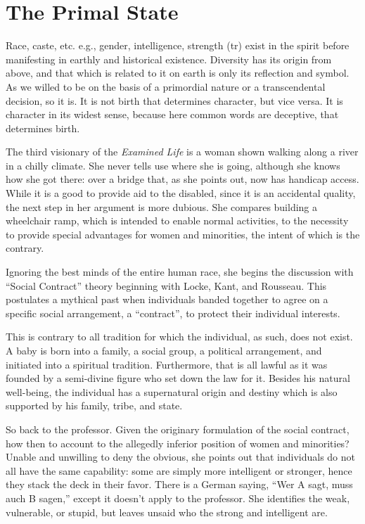 \section{The Primal State}

\begin{quotex}
Race, caste, etc. e.g., gender, intelligence, strength (tr) exist in the spirit before manifesting in earthly and historical existence. Diversity has its origin from above, and that which is related to it on earth is only its reflection and symbol. As we willed to be on the basis of a primordial nature or a transcendental decision, so it is. It is not birth that determines character, but vice versa. It is character in its widest sense, because here common words are deceptive, that determines birth.
\end{quotex}


The third visionary of the \emph{Examined Life} is a woman shown walking along a river in a chilly climate. She never tells use where she is going, although she knows how she got there: over a bridge that, as she points out, now has handicap access. While it is a good to provide aid to the disabled, since it is an accidental quality, the next step in her argument is more dubious. She compares building a wheelchair ramp, which is intended to enable normal activities, to the necessity to provide special advantages for women and minorities, the intent of which is the contrary.

Ignoring the best minds of the entire human race, she begins the discussion with ``Social Contract'' theory beginning with Locke, Kant, and Rousseau. This postulates a mythical past when individuals banded together to agree on a specific social arrangement, a ``contract'', to protect their individual interests.

This is contrary to all tradition for which the individual, as such, does not exist. A baby is born into a family, a social group, a political arrangement, and initiated into a spiritual tradition. Furthermore, that is all lawful as it was founded by a semi-divine figure who set down the law for it. Besides his natural well-being, the individual has a supernatural origin and destiny which is also supported by his family, tribe, and state.

So back to the professor. Given the originary formulation of the social contract, how then to account to the allegedly inferior position of women and minorities? Unable and unwilling to deny the obvious, she points out that individuals do not all have the same capability: some are simply more intelligent or stronger, hence they stack the deck in their favor. There is a German saying, ``Wer A sagt, muss auch B sagen,'' except it doesn't apply to the professor. She identifies the weak, vulnerable, or stupid, but leaves unsaid who the strong and intelligent are.


